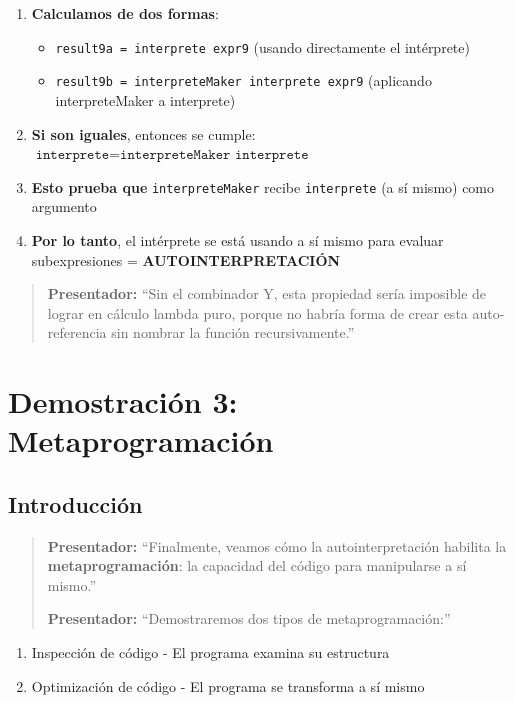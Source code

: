 \documentclass[12pt]{article}
\begin{document}
\begin{enumerate}
\item \textbf{Calculamos de dos formas}:
\begin{itemize}
\item \texttt{result9a = interprete expr9} (usando directamente el intérprete)
\item \texttt{result9b = interpreteMaker interprete expr9} (aplicando interpreteMaker a interprete)
\end{itemize}

\item \textbf{Si son iguales}, entonces se cumple: $\texttt{interprete} = \texttt{interpreteMaker interprete}$

\item \textbf{Esto prueba que} \texttt{interpreteMaker} recibe \texttt{interprete} (a sí mismo) como argumento

\item \textbf{Por lo tanto}, el intérprete se está usando a sí mismo para evaluar subexpresiones = \textbf{AUTOINTERPRETACIÓN}
\end{enumerate}

\begin{quote}
\textbf{Presentador:} ``Sin el combinador Y, esta propiedad sería imposible de lograr en cálculo lambda puro, porque no habría forma de crear esta auto-referencia sin nombrar la función recursivamente.''
\end{quote}

\newpage
\section{Demostración 3: Metaprogramación}

\subsection*{Introducción}

\begin{quote}
\textbf{Presentador:} ``Finalmente, veamos cómo la autointerpretación habilita la \textbf{metaprogramación}: la capacidad del código para manipularse a sí mismo.''

\textbf{Presentador:} ``Demostraremos dos tipos de metaprogramación:''
\end{quote}

\begin{enumerate}
\item Inspección de código - El programa examina su estructura
\item Optimización de código - El programa se transforma a sí mismo
\end{enumerate}
\end{document}
